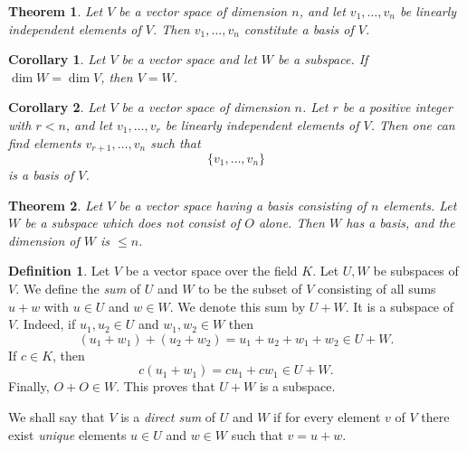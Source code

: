 \documentclass{article}
\newtheorem{theorem}{Theorem}[section]
\newtheorem{corollary}{Corollary}[section]
\theoremstyle{definition}
\newtheorem{definition}{Definition}[section]
\theoremstyle{remark}
\begin{document}
\begin{theorem} \label{thm:dim_n_basis}
Let \( V \) be a vector space of dimension \( n \), and let \( v_1, \dots, v_n \) be linearly independent elements of \( V \). Then \( v_1, \dots, v_n \) constitute a basis of \( V \).
\end{theorem}


\begin{corollary} \label{cor:equal_dimension}
Let \( V \) be a vector space and let \( W \) be a subspace. If \( \dim W = \dim V \), then \( V = W \).
\end{corollary}



\begin{corollary} \label{cor:extend_basis}
Let \( V \) be a vector space of dimension \( n \). Let \( r \) be a positive integer with \( r < n \), and let \( v_1, \dots, v_r \) be linearly independent elements of \( V \). Then one can find elements \( v_{r+1}, \dots, v_n \) such that
\[
\{ v_1, \dots, v_n \}
\]
is a basis of \( V \).
\end{corollary}

\begin{theorem} \label{thm:subspace_basis}
Let \( V \) be a vector space having a basis consisting of \( n \) elements. Let \( W \) be a subspace which does not consist of \( O \) alone. Then \( W \) has a basis, and the dimension of \( W \) is \( \leq n \).
\end{theorem}






\begin{definition} \label{def:sum_subspaces}
Let \( V \) be a vector space over the field \( K \). Let \( U, W \) be subspaces of \( V \). We define the \textit{sum} of \( U \) and \( W \) to be the subset of \( V \) consisting of all sums \( u + w \) with \( u \in U \) and \( w \in W \). We denote this sum by \( U + W \). It is a subspace of \( V \). Indeed, if \( u_1, u_2 \in U \) and \( w_1, w_2 \in W \) then
\[
(u_1 + w_1) + (u_2 + w_2) = u_1 + u_2 + w_1 + w_2 \in U + W.
\]
If \( c \in K \), then
\[
c (u_1 + w_1) = c u_1 + c w_1 \in U + W.
\]
Finally, \( O + O \in W \). This proves that \( U + W \) is a subspace.

We shall say that \( V \) is a \textit{direct sum} of \( U \) and \( W \) if for every element \( v \) of \( V \) there exist \textit{unique} elements \( u \in U \) and \( w \in W \) such that \( v = u + w \).
\end{definition}
\end{document}
